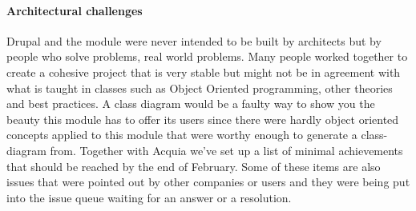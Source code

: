 \paragraph{Architectural challenges}
Drupal and the module were never intended to be built by architects but by people who solve problems, real world problems. Many people worked together to create a cohesive project that is very stable but might not be in agreement with what is taught in classes such as Object Oriented programming, other theories and best practices. A class diagram would be a faulty way to show you the beauty this module has to offer its users since there were hardly object oriented concepts applied to this module that were worthy enough to generate a class-diagram from. Together with Acquia we've set up a list of minimal achievements that should be reached by the end of  February. Some of these items are also issues that were pointed out by other companies or users and they were being put into the issue queue waiting for an answer or a resolution. 

